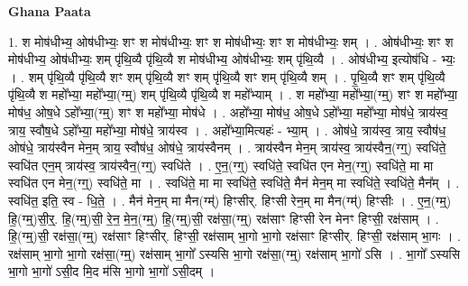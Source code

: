 \documentclass[17pt]{extarticle}
\begin{document}
\textbf{Ghana Paata } \newline

1. श मोष॑धीभ्य॒ ओष॑धीभ्यः॒ शꣳ श मोष॑धीभ्यः॒ शꣳ श मोष॑धीभ्यः॒ शꣳ श मोष॑धीभ्यः॒ शम् । . ओष॑धीभ्यः॒ शꣳ श मोष॑धीभ्य॒ ओष॑धीभ्यः॒ शम् पृ॑थि॒व्यै पृ॑थि॒व्यै श मोष॑धीभ्य॒ ओष॑धीभ्यः॒ शम् पृ॑थि॒व्यै । . ओष॑धीभ्य॒ इत्योष॑धि - भ्यः॒ । . शम् पृ॑थि॒व्यै पृ॑थि॒व्यै शꣳ शम् पृ॑थि॒व्यै शꣳ शम् पृ॑थि॒व्यै शꣳ शम् पृ॑थि॒व्यै शम् । . पृ॒थि॒व्यै शꣳ शम् पृ॑थि॒व्यै पृ॑थि॒व्यै श महो᳚भ्या॒ महो᳚भ्या॒(ग्म्॒) शम् पृ॑थि॒व्यै पृ॑थि॒व्यै श महो᳚भ्याम् । . श महो᳚भ्या॒ महो᳚भ्या॒(ग्म्॒) शꣳ श महो᳚भ्या॒ मोष॑ध॒ ओष॒धे ऽहो᳚भ्या॒(ग्म्॒) शꣳ श महो᳚भ्या॒ मोष॑धे । . अहो᳚भ्या॒ मोष॑ध॒ ओष॒धे ऽहो᳚भ्या॒ महो᳚भ्या॒ मोष॑धे॒ त्राय॑स्व॒ त्राय॒ स्वौष॒धे ऽहो᳚भ्या॒ महो᳚भ्या॒ मोष॑धे॒ त्राय॑स्व । . अहो᳚भ्या॒मित्यहः॑ - भ्या॒म् । . ओष॑धे॒ त्राय॑स्व॒ त्राय॒ स्वौष॑ध॒ ओष॑धे॒ त्राय॑स्वैन मेन॒म् त्राय॒ स्वौष॑ध॒ ओष॑धे॒ त्राय॑स्वैनम् । . त्राय॑स्वैन मेन॒म् त्राय॑स्व॒ त्राय॑स्वैन॒(ग्ग्॒) स्वधि॑ते॒ स्वधि॑त एन॒म् त्राय॑स्व॒ त्राय॑स्वैन॒(ग्ग्॒) स्वधि॑ते । . ए॒न॒(ग्ग्॒) स्वधि॑ते॒ स्वधि॑त एन मेन॒(ग्ग्॒) स्वधि॑ते॒ मा मा स्वधि॑त एन मेन॒(ग्ग्॒) स्वधि॑ते॒ मा । . स्वधि॑ते॒ मा मा स्वधि॑ते॒ स्वधि॑ते॒ मैन॑ मेन॒म् मा स्वधि॑ते॒ स्वधि॑ते॒ मैन᳚म् । . स्वधि॑त॒ इति॒ स्व - धि॒ते॒ । . मैन॑ मेन॒म् मा मैन(ग्म्॑) हिꣳसीर्. हिꣳसी रेन॒म् मा मैन(ग्म्॑) हिꣳसीः । . ए॒न॒(ग्म्॒) हि॒(ग्म्॒)सी॒र्॒. हि॒(ग्म्॒)सी॒ रे॒न॒ मे॒न॒(ग्म्॒) हि॒(ग्म्॒)सी॒ रक्ष॑सा॒(ग्म्॒) रक्ष॑साꣳ हिꣳसी रेन मेनꣳ हिꣳसी॒ रक्ष॑साम् । . हि॒(ग्म्॒)सी॒ रक्ष॑सा॒(ग्म्॒) रक्ष॑साꣳ हिꣳसीर्. हिꣳसी॒ रक्ष॑साम् भा॒गो भा॒गो रक्ष॑साꣳ हिꣳसीर्. हिꣳसी॒ रक्ष॑साम् भा॒गः । . रक्ष॑साम् भा॒गो भा॒गो रक्ष॑सा॒(ग्म्॒) रक्ष॑साम् भा॒गो᳚ ऽस्यसि भा॒गो रक्ष॑सा॒(ग्म्॒) रक्ष॑साम् भा॒गो॑ ऽसि । . भा॒गो᳚ ऽस्यसि भा॒गो भा॒गो॑ ऽसी॒द मि॒द म॑सि भा॒गो भा॒गो॑ ऽसी॒दम् । \newline
\end{document}
